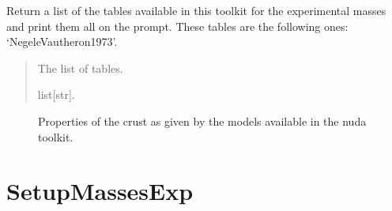 \documentclass[letterpaper,10pt,english]{sphinxmanual}
\begin{document}

\begin{fulllineitems}
\label{\detokenize{source/api/setup_crust:nucleardatapy.setup_crust.models_crust}}
\pysigstartsignatures
{}
\pysigstopsignatures
\sphinxAtStartPar
Return a list of the tables available in this toolkit for the experimental masses and
print them all on the prompt. These tables are the following
ones: ‘Negele\sphinxhyphen{}Vautheron\sphinxhyphen{}1973’.
\begin{quote}\begin{description}
\sphinxAtStartPar
The list of tables.

\sphinxAtStartPar
list{[}str{]}.

\end{description}\end{quote}

\end{fulllineitems}


\begin{figure}[htbp]
\centering
\capstart

\noindent{}
\caption{Properties of the crust as given by the models available in the nuda toolkit.}\label{\detokenize{source/api/setup_crust:id1}}\end{figure}

\sphinxstepscope


\section{SetupMassesExp}
\label{\detokenize{source/api/setup_masses_exp:setupmassesexp}}\label{\detokenize{source/api/setup_masses_exp::doc}}\label{\detokenize{source/api/setup_masses_exp:module-nucleardatapy.setup_masses_exp}}
\end{document}
